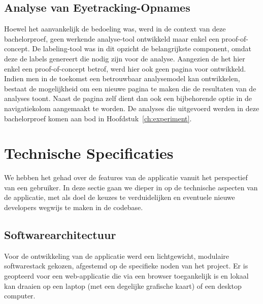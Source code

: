 \subsection{Analyse van Eyetracking-Opnames}

Hoewel het aanvankelijk de bedoeling was, werd in de context van deze bachelorproef, geen werkende analyse-tool ontwikkeld maar enkel een proof-of-concept.
De labeling-tool was in dit opzicht de belangrijkste component, omdat deze de labels genereert die nodig zijn voor de analyse.
Aangezien de het hier enkel een proof-of-concept betrof, werd hier ook geen pagina voor ontwikkeld.
Indien men in de toekomst een betrouwbaar analysemodel kan ontwikkelen, bestaat de mogelijkheid om een nieuwe pagina te maken die de resultaten van de analyses toont.
Naast de pagina zelf dient dan ook een bijbehorende optie in de navigatiekolom aangemaakt te worden.
De analyses die uitgevoerd werden in deze bachelorproef komen aan bod in Hoofdstuk~\ref{ch:experiment}.

\section{Technische Specificaties}

We hebben het gehad over de features van de applicatie vanuit het perspectief van een gebruiker.
In deze sectie gaan we dieper in op de technische aspecten van de applicatie, 
met als doel de keuzes te verduidelijken en eventuele nieuwe developers wegwijs te maken in de codebase.

\subsection{Softwarearchitectuur}

Voor de ontwikkeling van de applicatie werd een lichtgewicht, modulaire softwarestack gekozen, afgestemd op de specifieke noden van het project.
Er is geopteerd voor een web-applicatie die via een browser toegankelijk is en lokaal kan draaien op een laptop (met een degelijke grafische kaart) of een desktop computer.

